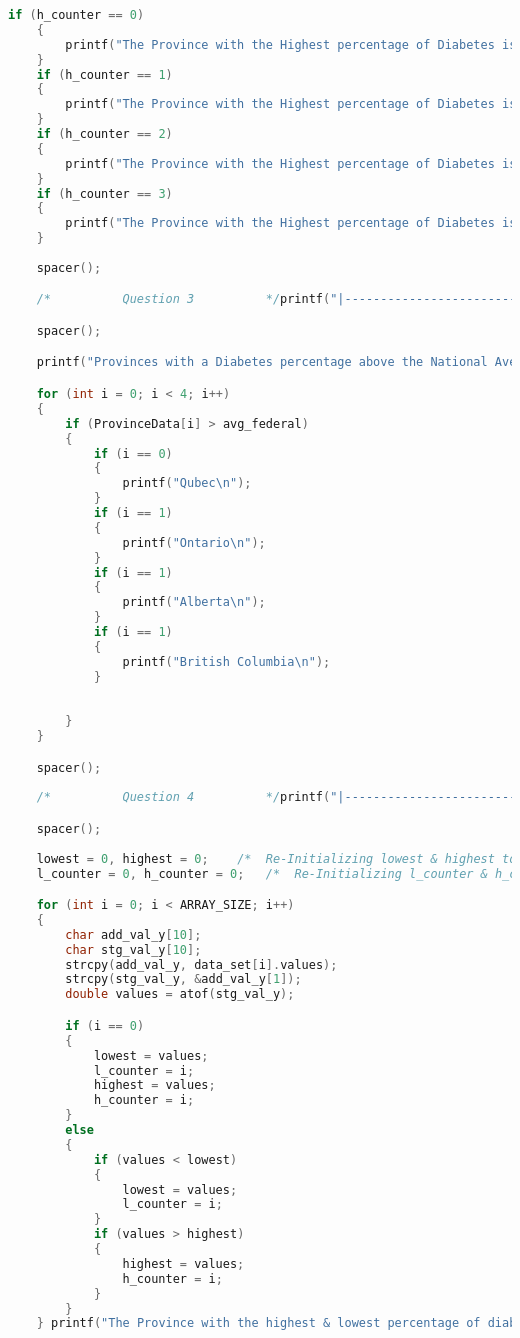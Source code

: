 \begin{lstlisting}[language=C, caption=\textit{CPS 188 Term Project Source Code}]
	if (h_counter == 0)
	{
		printf("The Province with the Highest percentage of Diabetes is Quebec\n");
	}
	if (h_counter == 1)
	{
		printf("The Province with the Highest percentage of Diabetes is Ontario\n");
	}
	if (h_counter == 2)
	{
		printf("The Province with the Highest percentage of Diabetes is Alberta\n");
	}
	if (h_counter == 3)
	{
		printf("The Province with the Highest percentage of Diabetes is British Columbia\n");
	}
	
	spacer();

	/*          Question 3          */printf("|------------------------------------------------------------------------------------------Question 3------------------------------------------------------------------------------------------|\n");

	spacer();

	printf("Provinces with a Diabetes percentage above the National Average are:\n\n");

	for (int i = 0; i < 4; i++)
	{
		if (ProvinceData[i] > avg_federal)
		{
			if (i == 0)
			{
				printf("Qubec\n");
			}
			if (i == 1)
			{
				printf("Ontario\n");
			}
			if (i == 1)
			{
				printf("Alberta\n");
			}
			if (i == 1)
			{
				printf("British Columbia\n");
			}
			
			
		}
	}

	spacer();
	
	/*          Question 4          */printf("|------------------------------------------------------------------------------------------Question 4------------------------------------------------------------------------------------------|\n");

	spacer();
	
	lowest = 0, highest = 0;	/*	Re-Initializing lowest & highest to 0	*/
	l_counter = 0, h_counter = 0;	/*	Re-Initializing l_counter & h_counter to 0	*/

	for (int i = 0; i < ARRAY_SIZE; i++)
    {
		char add_val_y[10];
		char stg_val_y[10];
		strcpy(add_val_y, data_set[i].values);
		strcpy(stg_val_y, &add_val_y[1]);
		double values = atof(stg_val_y);

		if (i == 0)
		{
			lowest = values;
			l_counter = i;
			highest = values;
			h_counter = i;
		}
		else
		{
			if (values < lowest)
			{
				lowest = values;
				l_counter = i;
			}
			if (values > highest)
			{
				highest = values;
				h_counter = i;
			}
		}			
	} printf("The Province with the highest & lowest percentage of diabetes in a year is British Columbia & Ontario in the year's %s & %s\n", data_set[h_counter].year, data_set[l_counter].year);


\end{lstlisting}
